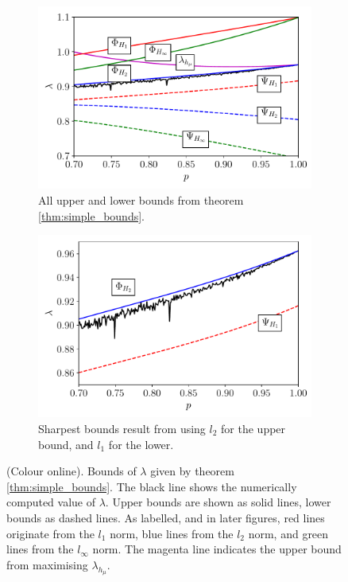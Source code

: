 \documentclass{iopart}
\begin{document}
\begin{figure}
     \centering
     \begin{subfigure}[b]{0.49\textwidth}
         \centering
         \includegraphics[width=\textwidth]{ltm_simple_bounds_bw.pdf}
         \caption{All upper and lower bounds from theorem \ref{thm:simple_bounds}.}
         \label{fig:simple_bounds}
     \end{subfigure}
     \hfill
     \begin{subfigure}[b]{0.49\textwidth}
         \centering
         \includegraphics[width=\textwidth]{ltm_simple_bounds_zoom.pdf}
         \caption{Sharpest bounds result from using $l_2$ for the upper bound, and $l_1$ for the lower. }
         \label{fig:simple_bounds_zoom}
     \end{subfigure}
        \caption{(Colour online). Bounds of $\lambda$ given by theorem \ref{thm:simple_bounds}. The black line shows the numerically computed value of $\lambda$. Upper bounds are shown as solid lines, lower bounds as dashed lines. As labelled, and in later figures, red lines originate from the $l_1$ norm, blue lines from the $l_2$ norm, and green lines from the $l_{\infty}$ norm. The magenta line indicates the upper bound from maximising $\lambda_{h_{\mu}}$.} 
        \label{fig:simple}
\end{figure}
\end{document}
